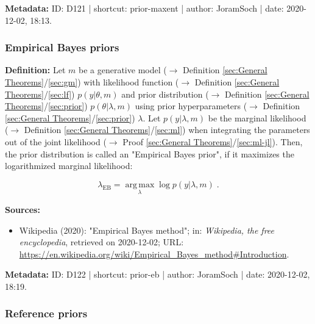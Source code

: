 \documentclass[a4paper,12pt,twoside]{book}
\begin{document}
\vspace{1em}
\textbf{Metadata:} ID: D121 | shortcut: prior-maxent | author: JoramSoch | date: 2020-12-02, 18:13.
\vspace{1em}



\subsubsection[\textit{Empirical Bayes priors}]{Empirical Bayes priors} \label{sec:prior-eb}
\setcounter{equation}{0}

\textbf{Definition:} Let $m$ be a generative model ($\rightarrow$ Definition \ref{sec:General Theorems}/\ref{sec:gm}) with likelihood function ($\rightarrow$ Definition \ref{sec:General Theorems}/\ref{sec:lf}) $p(y \vert \theta, m)$ and prior distribution ($\rightarrow$ Definition \ref{sec:General Theorems}/\ref{sec:prior}) $p(\theta \vert \lambda, m)$ using prior hyperparameters ($\rightarrow$ Definition \ref{sec:General Theorems}/\ref{sec:prior}) $\lambda$. Let $p(y \vert \lambda, m)$ be the marginal likelihood ($\rightarrow$ Definition \ref{sec:General Theorems}/\ref{sec:ml}) when integrating the parameters out of the joint likelihood ($\rightarrow$ Proof \ref{sec:General Theorems}/\ref{sec:ml-jl}). Then, the prior distribution is called an "Empirical Bayes prior", if it maximizes the logarithmized marginal likelihood:

\begin{equation} \label{eq:prior-eb-prior-eb}
\lambda_{\mathrm{EB}} = \operatorname*{arg\,max}_{\lambda} \log p(y \vert \lambda, m) \; .
\end{equation}


\vspace{1em}
\textbf{Sources:}
\begin{itemize}
\item Wikipedia (2020): "Empirical Bayes method"; in: \textit{Wikipedia, the free encyclopedia}, retrieved on 2020-12-02; URL: \url{https://en.wikipedia.org/wiki/Empirical_Bayes_method#Introduction}.
\end{itemize}


\vspace{1em}
\textbf{Metadata:} ID: D122 | shortcut: prior-eb | author: JoramSoch | date: 2020-12-02, 18:19.
\vspace{1em}



\subsubsection[\textit{Reference priors}]{Reference priors} \label{sec:prior-ref}
\setcounter{equation}{0}
\end{document}
